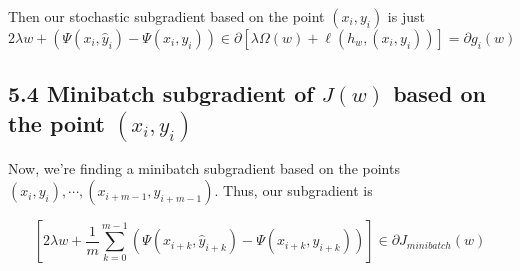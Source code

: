 \documentclass[paper=a4, fontsize=11pt]{scrartcl} %
\numberwithin{equation}{section} %
\numberwithin{figure}{section} %
\numberwithin{table}{section} %
\begin{document}
Then our stochastic subgradient based on the point $(x_i, y_i)$ is just
\[2 \lambda w + \left(\Psi(x_i, \hat{y}_i) - \Psi(x_i, y_i)\right) \in \partial [\lambda \Omega(w) + \ell(h_w, (x_i, y_i))] = \partial g_i(w) \]

\subsection*{5.4 Minibatch subgradient of $J(w)$ based on the point $(x_i, y_i)$}

Now, we're finding a minibatch subgradient based on the points $(x_i, y_i), \cdots, (x_{i+m-1}, y_{i + m -1})$. Thus, our subgradient is

\[\left[2\lambda w + \frac{1}{m} \sum_{k = 0}^{m -1} \left(\Psi(x_{i + k}, \hat{y}_{i + k}) - \Psi(x_{i + k}, y_{i + k})\right) \right]\in \partial J_{minibatch}(w)\]

\end{document}
